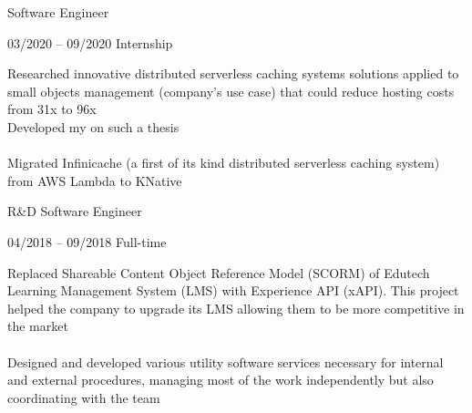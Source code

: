 \documentclass[9pt, green]{template/developercv} %
\begin{document}
{\begin{entrylist}
{\begin{minipage}[t]{0.75\textwidth}
		\end{minipage}

	}
	{Software Engineer}
	
	\entry
	{03/2020 -- 09/2020}
	{}
	{Internship}
	{
		\vspace{0.3mm}
		\begin{minipage}[t]{0.75\textwidth}
			\vspace{-\baselineskip}
			\itemmarker Researched innovative distributed serverless caching systems solutions applied to small objects management (company's use case) that could reduce hosting costs from 31x to 96x\\
			\itemmarker Developed my  on such a thesis\\
			\vspace{-3mm}\\
			\itemmarker Migrated Infinicache (a first of its kind distributed serverless caching system) from AWS Lambda to KNative\\
			\vspace{-3mm}
		\end{minipage}

	}
	{R\&D Software Engineer}
	
	\entry
		{04/2018 -- 09/2018}
		{}
		{Full-time}
		{
			\vspace{0.3mm}
			\begin{minipage}[t]{0.75\textwidth}
				\vspace{-\baselineskip}
				\itemmarker Replaced Shareable Content Object Reference Model (SCORM) of Edutech Learning Management System (LMS) with Experience API (xAPI). This project helped the company to upgrade its LMS allowing them to be more competitive in the market\\
				\vspace{-3mm}\\
				\itemmarker Designed and developed various utility software services necessary for internal and external procedures, managing most of the work independently but also coordinating with the team\\
				\vspace{-3mm}
			\end{minipage}

}
\end{entrylist}}
\end{document}
